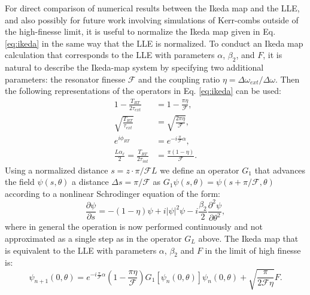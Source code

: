 For direct comparison of numerical results between the Ikeda map and the LLE, and also possibly for future work involving simulations of Kerr-combs outside of the high-finesse limit, it is useful to normalize the Ikeda map given in Eq. \ref{eq:ikeda} in the same way that the LLE is normalized. To conduct an Ikeda map calculation that corresponds to the LLE with parameters $\alpha$, $\beta_2$, and $F$, it is natural to describe the Ikeda-map system by specifying two additional parameters: the resonator finesse $\mathcal{F}$ and the coupling ratio $\eta=\Delta\omega_{ext}/\Delta\omega$. Then the following representations of the operators in Eq. \ref{eq:ikeda} can be used:
\begin{align}
1-\frac{T_{RT}}{2\tau_{ext}}&=1-\frac{\pi\eta}{\mathcal{F}},\\
\sqrt{\frac{T_{RT}}{\tau_{ext}}}&=\sqrt{\frac{2\pi\eta}{\mathcal{F}}},\\
e^{i\phi_{RT}}&=e^{-i\frac{\pi}{\mathcal{F}}\alpha},\\
\frac{L\alpha_\ell}{2}=\frac{T_{RT}}{2\tau_{int}}&=\frac{\pi(1-\eta)}{\mathcal{F}}.
\end{align}
Using a normalized distance $s=z\cdot \pi/\mathcal{F}L$ we define an operator $G_1$ that advances the field $\psi(s,\theta)$ a distance $\Delta s=\pi/\mathcal{F}$ as $G_1 \psi(s,\theta)=\psi(s+\pi/\mathcal{F},\theta)$ according to a nonlinear Schrodinger equation of the form:
\begin{equation}
\frac{\partial \psi}{\partial s}= -(1-\eta) \psi+i|\psi|^2 \psi -i \frac{\beta_2}{2} \frac{\partial^2 \psi}{\partial \theta^2},
\end{equation}
where in general the operation is now performed continuously and not approximated as a single step as in the operator $G_L$ above. The Ikeda map that is equivalent to the LLE with parameters $\alpha$, $\beta_2$ and $F$ in the limit of high finesse is:
\begin{equation}
\psi_{n+1}(0,\theta)=e^{-i\frac{\pi}{\mathcal{F}}\alpha}\left(1-\frac{\pi\eta}{\mathcal{F}}\right)G_1\left[\psi_n(0,\theta)\right]\psi_n(0,\theta)+\sqrt{\frac{\pi}{2\mathcal{F}\eta}}F.
\end{equation}


%
%
%
%

